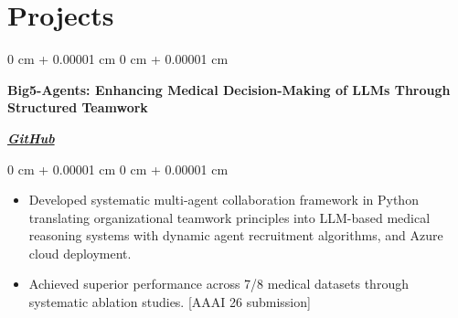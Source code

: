 \documentclass[10pt, letterpaper]{article}
\newenvironment{highlights}{
    \begin{itemize}[
        topsep=0.10 cm,
        parsep=0.10 cm,
        partopsep=0pt,
        itemsep=0pt,
        leftmargin=0 cm + 10pt
    ]
}{
    \end{itemize}
} %
\newenvironment{onecolentry}{
    \begin{adjustwidth}{
        0 cm + 0.00001 cm
    }{
        0 cm + 0.00001 cm
    }
}{
    \end{adjustwidth}
} %
\newenvironment{twocolentry}[2][]{
    \onecolentry
    \def\secondColumn{#2}
    \setcolumnwidth{\fill, 4.5 cm}
    \begin{paracol}{2}
}{
    \switchcolumn \raggedleft \secondColumn
    \end{paracol}
    \endonecolentry
} %
\begin{document}

\section{Projects}

\begin{twocolentry}{
           \href{https://github.com/PranavMishra17/Big5-Agents}{\textbf{\textit{GitHub}}}
       }
           \textbf{Big5-Agents: Enhancing Medical Decision-Making of LLMs Through Structured Teamwork}
\end{twocolentry}
\vspace{0.10 cm}
\begin{onecolentry}
   \begin{highlights}
\item Developed systematic multi-agent collaboration framework in Python translating organizational teamwork principles into LLM-based medical reasoning systems with dynamic agent recruitment algorithms, and Azure cloud deployment.
   \end{highlights}
   \begin{highlights}
\item Achieved superior performance across 7/8 medical datasets through systematic ablation studies. [AAAI 26 submission]
   \end{highlights}
\end{onecolentry}
\end{document}
